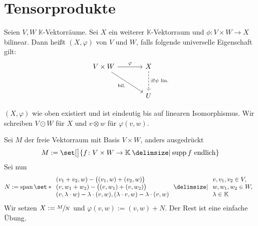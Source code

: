 \tableofcontents
\cleardoubleoddemptypage

\setcounter{page}{1}
\setcounter{footnote}{0}

\section{Tensorprodukte} %
\label{sec:1}

\begin{erinnerungA}[{name=[Tensorprodukt]}]
	Seien $V,W$ $\mathbb{K}$-Vektorräume.
	Sei $X$ ein weiterer $\mathbb{K}$-Vektorraum und $\phi \colon V\times W \to X$ bilinear.
	Dann heißt $(X,\varphi)$  von $V$ und $W$, falls folgende universelle Eigenschaft gilt:
	\[
		\begin{tikzcd}[sep=large]
			V \times W \drar["\text{bil.}"'] \rar["\varphi"] & X \dar[dashed,"\exists ! \psi \text{ lin.} "] \\
			& U
		\end{tikzcd}
	\]
\end{erinnerungA}

\begin{definitionP}[label=propdef:12,{name=[{Konstruktion des algebraischen Tensorproduktes}]}]
	$(X,\varphi)$ wie oben existiert und ist eindeutig bis auf linearen Isomorphismus.
	Wir schreiben $V \odot W$ für $X$ und $v \otimes w$ für $\varphi(v,w)$.
\end{definitionP}
\begin{beweis}
	Sei $M$ der freie Vektorraum mit Basis $V \times W$, anders ausgedrückt
	\[
		M:= \set[\big]{f \colon V\times W \to \mathbb{K} \given \supp f \text{ endlich}}
	\]
	Sei nun 
	\[
		N := \Span \set*{
			\begin{array}{l}
				(v_1 +v_2,w) - \enbrace[\big]{(v_1,w) + (v_2,w)} \\
				(v,w_1+w_2) - \enbrace[\big]{(v,w_1) + (v,w_2)} \\
				(v,\lambda \cdot w) - \lambda \cdot (v,w), (\lambda \cdot v,w) - \lambda \cdot (v,w) 
			\end{array}
		\given 
		\begin{array}{l}
			v,v_1,v_2 \in V,\\
			w,w_1,w_2 \in W,\\
			\lambda \in \mathbb{K}
		\end{array}}
	\]
	Wir setzen $X := \sfrac{M}{N}$ und $\varphi(v,w) := (v,w)+N$.
	Der Rest ist eine einfache Übung.
\end{beweis}

